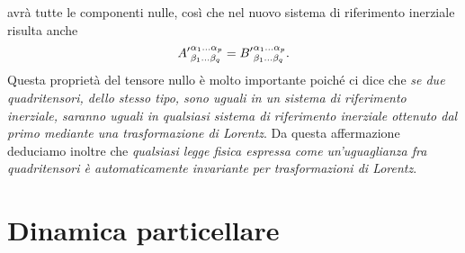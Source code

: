 avrà tutte le componenti nulle, così che nel nuovo sistema di riferimento
inerziale risulta anche
\begin{equation}
  \tensor*{{A'}}{^{\alpha_{1}\dots\alpha_{p}}_{\beta_{1}\dots\beta_{q}}} =
  \tensor*{{B'}}{^{\alpha_{1}\dots\alpha_{p}}_{\beta_{1}\dots\beta_{q}}}.
\end{equation}
Questa proprietà del tensore nullo è molto importante poiché ci dice che
\emph{se due quadritensori, dello stesso tipo, sono uguali in un sistema di
  riferimento inerziale, saranno uguali in qualsiasi sistema di riferimento
  inerziale ottenuto dal primo mediante una trasformazione di Lorentz}.
Da questa affermazione deduciamo inoltre che\label{invarianza-lorentz}
\emph{qualsiasi legge fisica espressa come un'uguaglianza fra quadritensori è
  automaticamente invariante per trasformazioni di Lorentz}.

\section{Dinamica particellare}
\label{sec:dinamica-particellare}


